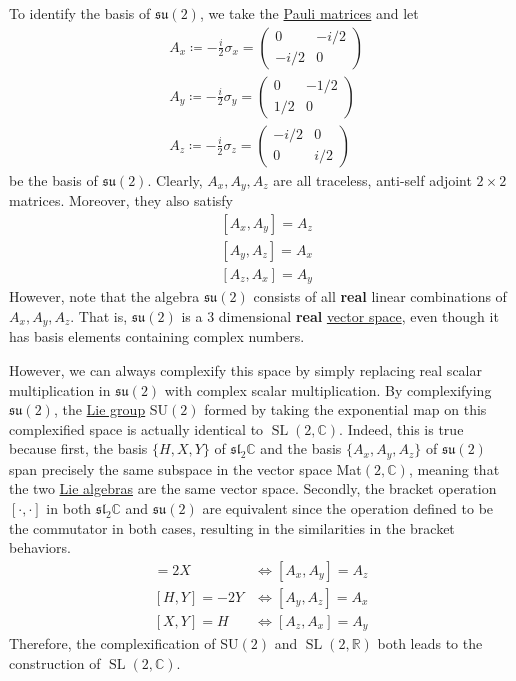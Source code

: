 \documentclass{article}
\DeclareMathOperator{\SL}{SL}
\begin{document}
    To identify the basis of $\mathfrak{su}(2)$, we take the \hyperref[def:pauli-matrices]{Pauli matrices} and let 
    \begin{align*}
      & A_x \coloneqq - \frac{i}{2} \sigma_x = \begin{pmatrix} 0&-i/2\\-i/2&0 \end{pmatrix} \\
      & A_y \coloneqq - \frac{i}{2} \sigma_y = \begin{pmatrix}0&-1/2\\1/2&0\end{pmatrix} \\
      & A_z \coloneqq -\frac{i}{2} \sigma_z = \begin{pmatrix}-i/2&0\\0&i/2\end{pmatrix}
    \end{align*} 
    be the basis of $\mathfrak{su}(2)$. Clearly, $A_x, A_y, A_z$ are all traceless, anti-self adjoint $2 \times 2$ matrices. Moreover, they also satisfy
    \begin{align*}
      & [A_x, A_y] = A_z \\
      & [A_y, A_z] = A_x \\
      & [A_z, A_x] = A_y
    \end{align*}
    However, note that the algebra $\mathfrak{su}(2)$ consists of all \textbf{real} linear combinations of $A_x, A_y, A_z$. That is, $\mathfrak{su}(2)$ is a 3 dimensional \textbf{real} \hyperref[lin-def:vector-space]{vector space}, even though it has basis elements containing complex numbers. 

    However, we can always complexify this space by simply replacing real scalar multiplication in $\mathfrak{su}(2)$ with complex scalar multiplication. By complexifying $\mathfrak{su}(2)$, the \hyperref[def:lie-group]{Lie group} SU$(2)$ formed by taking the exponential map on this complexified space is actually identical to $\SL(2, \mathbb{C})$. Indeed, this is true because first, the basis $\{H, X, Y\}$ of $\mathfrak{sl}_2 \mathbb{C}$ and the basis $\{A_x, A_y, A_z\}$ of $\mathfrak{su}(2)$ span precisely the same subspace in the vector space Mat$(2, \mathbb{C})$, meaning that the two \hyperref[def:lie-algebra]{Lie algebras} are the same vector space. Secondly, the bracket operation $[\cdot, \cdot]$ in both $\mathfrak{sl}_2 \mathbb{C}$ and $\mathfrak{su}(2)$ are equivalent since the operation defined to be the commutator in both cases, resulting in the similarities in the bracket behaviors. 
    \begin{align*}
      [H,X] = 2X & \iff [A_x, A_y] = A_z \\
      [H,Y] = - 2Y & \iff [A_y, A_z] = A_x\\
      [X,Y] = H & \iff  [A_z, A_x] = A_y 
    \end{align*}
    Therefore, the complexification of SU$(2)$ and $\SL(2, \mathbb{R})$ both leads to the construction of $\SL(2, \mathbb{C})$. 
\end{document}
